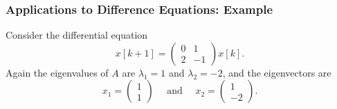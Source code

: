 \documentclass{beamer}
\begin{document}
\begin{frame}\frametitle{Applications to Difference Equations: Example}


	Consider the differential equation
	\[
		x[k+1] 
			= \begin{pmatrix}
	    		0 & 1\\
	    		2 & -1
	  		  \end{pmatrix} x[k].
	\]
	Again the eigenvalues of $A$ are $\lambda_1 = 1$ and $\lambda_2 = -2$, and the eigenvectors are
	\[ 
		x_1 = \begin{pmatrix} 1 \\ 1 \end{pmatrix} 
		\quad \text{ and } \quad
		x_2 =  \begin{pmatrix} 1 \\ -2 \end{pmatrix}.
	\]
		
\end{frame}
\end{document}
